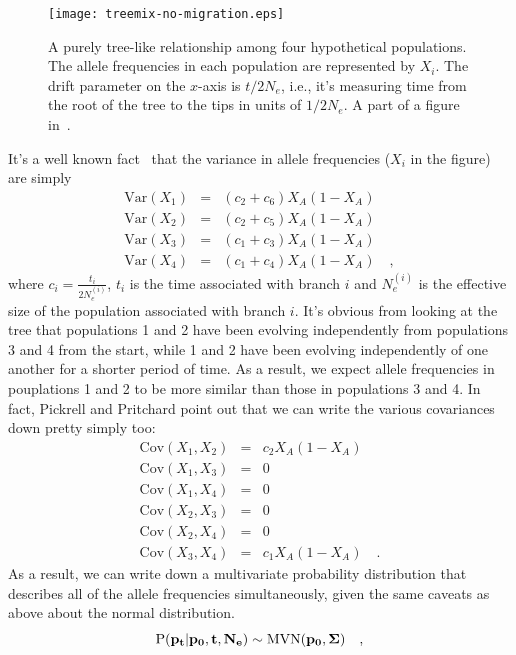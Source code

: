 \begin{figure}
  \begin{center}
    \texttt{[image: treemix-no-migration.eps]}
  \end{center}
  \caption{A purely tree-like relationship among four hypothetical
    populations. The allele frequencies in each population are
    represented by $X_i$. The drift parameter on the $x$-axis is $t/2N_e$,
    i.e., it's measuring time from the root of the tree to the tips in
    units of $1/2N_e$. A part of a figure in~\cite{Pickrell-Pritchard-2012}.}\label{fig:treemix-no-migration}
\end{figure}

It's a well known fact~\cite{CavalliSforza-Edwards-1967} that the
variance in allele frequencies ($X_i$ in the figure) are simply
\begin{eqnarray*}
  \mbox{Var}(X_1) &=& (c_2 + c_6)X_A(1-X_A) \\
  \mbox{Var}(X_2) &=& (c_2 + c_5)X_A(1-X_A) \\
  \mbox{Var}(X_3) &=& (c_1 + c_3)X_A(1-X_A) \\
  \mbox{Var}(X_4) &=& (c_1 + c_4)X_A(1-X_A) \quad ,
\end{eqnarray*}
where $c_i = \frac{t_i}{2N_e^{(i)}}$, $t_i$ is the time associated
with branch $i$ and $N_e^{(i)}$ is the effective size of the
population associated with branch $i$. It's obvious from looking at
the tree that populations 1 and 2 have been evolving independently
from populations 3 and 4 from the start, while 1 and 2 have been
evolving independently of one another for a shorter period of time. As
a result, we expect allele frequencies in pouplations 1 and 2 to be
more similar than those in populations 3 and 4. In fact, Pickrell and
Pritchard point out that we can write the various covariances down
pretty simply too:
\begin{eqnarray*}
  \mbox{Cov}(X_1,X_2) &=& c_2X_A(1-X_A) \\
  \mbox{Cov}(X_1,X_3) &=& 0 \\
  \mbox{Cov}(X_1,X_4) &=& 0 \\
  \mbox{Cov}(X_2,X_3) &=& 0 \\
  \mbox{Cov}(X_2,X_4) &=& 0 \\
  \mbox{Cov}(X_3,X_4) &=& c_1X_A(1-X_A) \quad .
\end{eqnarray*}
As a result, we can write down a multivariate probability distribution
that describes all of the allele frequencies simultaneously, given the
same caveats as above about the normal distribution.
\[
  \mbox{P}(\bf p_t|\bf p_0, \bf t, \bf N_e) \sim \mbox{MVN}(\bf p_0,
  \bf \Sigma) \quad ,
\]
